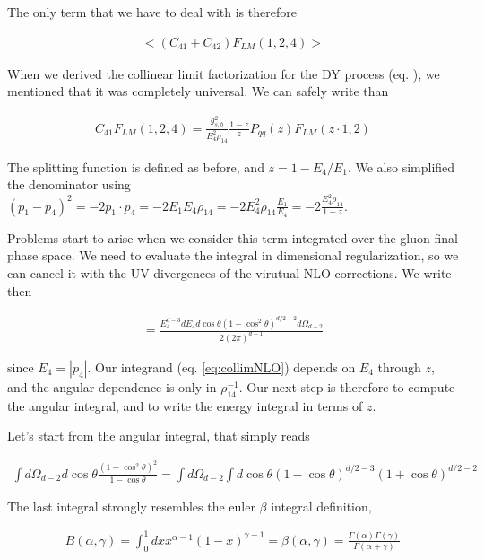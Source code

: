 \documentclass[11pt]{report}
\begin{document}
The only term that we have to deal with is therefore 

\begin{align}
    <(C_{41} + C_{42})F_{LM}(1,2,4)>
\end{align}

When we derived the collinear limit factorization for the DY process (eq. ), we mentioned that it was completely universal. We can safely write than 

\begin{align}
    \label{eq:collimNLO}
    C_{41}F_{LM}(1, 2, 4) = \frac{g^2_{s,b}}{E_4^2\rho_{14}}\frac{1-z}{z}P_{qq}(z)F_{LM}(z\cdot1, 2)
\end{align}

The splitting function is defined as before, and \(z = 1- E_4/E_1\). We also simplified the denominator using \((p_1-p_4)^2 = -2p_1\cdot p_4 = -2E_1E_4\rho_{14} = -2E_4^2\rho_{14}\frac{E_1}{E_4} = -2\frac{E_4^2\rho_{14}}{1-z}\). 

Problems start to arise when we consider this term integrated over the gluon final phase space. We need to evaluate the integral in dimensional regularization, so we can cancel it with the UV divergences of the virutual NLO corrections. We write then 

\begin{align}
    [dg_4] = \frac{E_4^{d-3}dE_4 d\cos\theta (1-\cos^2\theta)^{d/2-2} d\Omega_{d-2}}{2(2\pi)^{d-1}}
\end{align}

since \(E_4 = |p_4|\). Our integrand (eq. \ref{eq:collimNLO}) depends on \(E_4\) through \(z\), and the angular dependence is only in \(\rho_{14}^{-1}\). Our next step is therefore to compute the angular integral, and to write the energy integral in terms of \(z\).  

Let's start from the angular integral, that simply reads 

\begin{align}
    \int d\Omega_{d-2} d\cos\theta \frac{(1-\cos^2\theta)^2}{1-\cos\theta} = \int d\Omega_{d-2}\int d\cos\theta (1-\cos\theta)^{d/2-3}(1+\cos\theta)^{d/2-2}
\end{align}

The last integral strongly resembles the euler \(\beta\) integral definition, 

\begin{align}
    B(\alpha, \gamma) = \int_0^1 dx x^{\alpha-1}(1-x)^{\gamma-1} = \beta(\alpha, \gamma) = \frac{\Gamma(\alpha)\Gamma(\gamma)}{\Gamma(\alpha+\gamma)}
\end{align}
\end{document}

